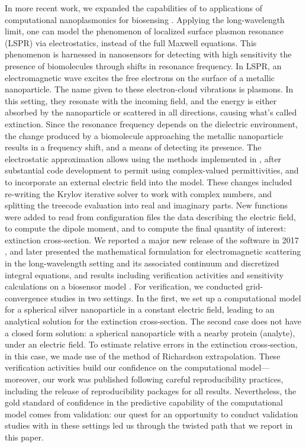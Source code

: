 In more recent work, we expanded the capabilities of \pygbe to applications of computational nanoplasmonics for biosensing \cite{ClementiETal2019}. 
Applying the long-wavelength limit, one can model the phenomenon of localized surface plasmon resonance (LSPR) via electrostatics, instead of the full Maxwell equations. 
This phenomenon is harnessed in nanosensors for detecting with high sensitivity the presence of biomolecules through shifts in resonance frequency. 
In LSPR, an electromagnetic wave excites the free electrons on the surface of a metallic nanoparticle. 
The name given to these electron-cloud vibrations is plasmons. 
In this setting, they resonate with the incoming field, and the energy is either absorbed by the nanoparticle or scattered in all directions, causing what's called extinction.
Since the resonance frequency depends on the dielectric environment, the change produced by a biomolecule approaching the metallic nanoparticle results in a frequency shift, and a means of detecting its presence.
The electrostatic approximation allows using the methods implemented in \pygbe, after substantial code development to permit using complex-valued permittivities, and to incorporate an external electric field into the model. 
These changes included re-writing the Krylov iterative solver to work with complex numbers, and splitting the treecode evaluation into real and imaginary parts. 
New functions were added to read from configuration files the data describing the electric field, to compute the dipole moment, and to compute the final quantity of interest: extinction cross-section. 
We reported a major new release of the software in 2017 \cite{ClementiETal2017}, and later  presented the mathematical formulation for electromagnetic scattering in the long-wavelength setting and its associated continuum and discretized integral equations, and results including verification activities and sensitivity calculations on a biosensor model \cite{ClementiETal2019}. 
For verification, we conducted grid-convergence studies in two settings.
In the first, we set up a computational model for a spherical silver nanoparticle in a constant electric field, leading to an analytical solution for the extinction cross-section. 
The second case does not have a closed form solution: a spherical nanoparticle with a nearby protein (analyte), under an electric field. 
To estimate relative errors in the extinction cross-section, in this case, we made use of the method of Richardson extrapolation.
These verification activities build our confidence on the computational model---moreover, our work was published following careful reproducibility practices, including the release of reproducibility packages for all results. 
Nevertheless, the gold standard of confidence in the predictive capability of the computational model comes from validation: our quest for an opportunity to conduct validation studies with \pygbe in these settings led us through the twisted path that we report in this paper.


